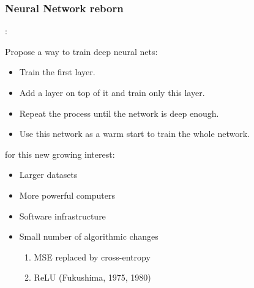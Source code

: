 \begin{frame}
	\frametitle{Neural Network reborn}



:

\smallskip

Propose a way to train deep neural nets:
\begin{itemize}
	\item Train the first layer.
	\item Add a layer on top of it and train only this layer.
	\item Repeat the process until the network is deep enough.
	\item Use this network as a warm start to train the whole network.
\end{itemize}

\bigskip

 for this new growing interest:
\begin{itemize}
	\item Larger datasets
	\item More powerful computers
	\item Software infrastructure
	\item Small number of algorithmic changes
	\begin{enumerate}
		\item MSE replaced by cross-entropy
		\item ReLU (Fukushima, 1975, 1980)
	\end{enumerate}
\end{itemize}
\end{frame}








